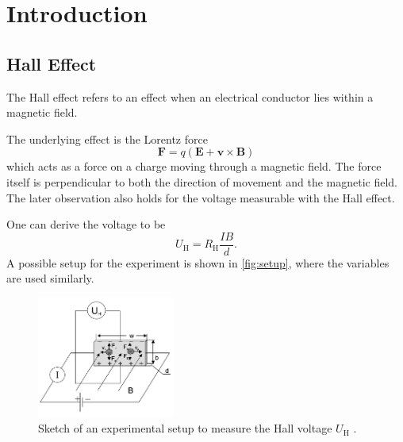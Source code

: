\section{Introduction}
\label{sec:introduction}

\subsection{Hall Effect}
\label{sec:intr:hall}
The Hall effect refers to an effect when an electrical conductor lies within a magnetic field. 

The underlying effect is the Lorentz force
\[
  \mathbf F = q (\mathbf E + \mathbf v \times \mathbf B)
\]
which acts as a force on a charge moving through a magnetic field. The force itself is perpendicular
to both the direction of movement and the magnetic field. The later observation also holds for the
voltage measurable with the Hall effect.

One can derive the voltage to be 
\begin{equation}
  U_\text{H} = R_\text{H} \frac{I B}{d}.
  \label{eqn:intr:U_H}
\end{equation}
A possible setup for the experiment is shown in \autoref{fig:setup}, where the variables are used
similarly. 
\begin{figure}
  \centering
  \includegraphics[width=0.4\textwidth]{media/setup_sketch.png}
  \caption{Sketch of an experimental setup to measure the Hall voltage $U_\text{H}$ \cite{leaflet}.}
  \label{fig:setup}
\end{figure}

